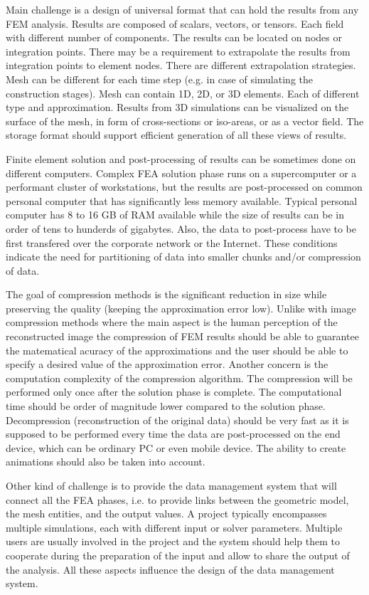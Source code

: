 Main challenge is a design of universal format that can hold the results from any FEM analysis. Results are composed of scalars, vectors, or tensors. Each field with different number of components. The results can be located on nodes or integration points. There may be a requirement to extrapolate the results from integration points to element nodes. There are different extrapolation strategies. Mesh can be different for each time step (e.g. in case of simulating the construction stages). Mesh can contain 1D, 2D, or 3D elements. Each of different type and approximation. Results from 3D simulations can be visualized on the surface of the mesh, in form of cross-sections or iso-areas, or as a vector field. The storage format should support efficient generation of all these views of results.

Finite element solution and post-processing of results can be sometimes done on different computers. Complex FEA solution phase runs on a supercomputer or a performant cluster of workstations, but the results are post-processed on common personal computer that has significantly less memory available. Typical personal computer has 8 to 16 GB of RAM available while the size of results can be in order of tens to hunderds of gigabytes. Also, the data to post-process have to be first transfered over the corporate network or the Internet. These conditions indicate the need for partitioning of data into smaller chunks and/or compression of data.

The goal of compression methods is the significant reduction in size while preserving the quality (keeping the approximation error low). Unlike with image compression methods where the main aspect is the human perception of the reconstructed image the compression of FEM results should be able to guarantee the matematical acuracy of the approximations and the user should be able to specify a desired value of the approximation error. Another concern is the computation complexity of the compression algorithm. The compression will be performed only once after the solution phase is complete. The computational time should be order of magnitude lower compared to the solution phase. Decompression (reconstruction of the original data) should be very fast as it is supposed to be performed every time the data are post-processed on the end device, which can be ordinary PC or even mobile device. The ability to create animations should also be taken into account.

Other kind of challenge is to provide the data management system that will connect all the FEA phases, i.e. to provide links between the geometric model, the mesh entities, and the output values. A project typically encompasses multiple simulations, each with different input or solver parameters. Multiple users are usually involved in the project and the system should help them to cooperate during the preparation of the input and allow to share the output of the analysis. All these aspects influence the design of the data management system.

